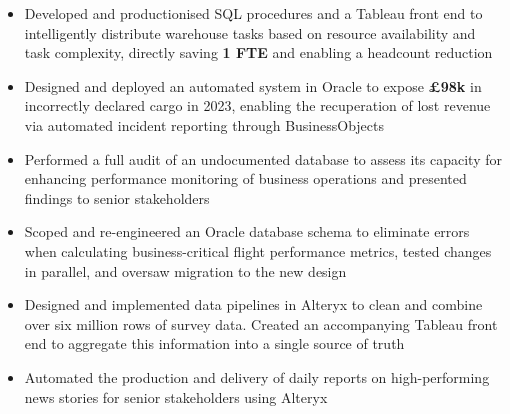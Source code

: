 \begin{paracol}{2}
\begin{itemize}

\medskip
{}

\end{itemize}

\divider

\begin{itemize}
\item Developed and productionised SQL procedures and a Tableau front end to intelligently distribute warehouse tasks based on resource availability and task complexity, directly saving \textbf{1 FTE} and enabling a headcount reduction
\item Designed and deployed an automated system in Oracle to expose \textbf{£98k} in incorrectly declared cargo in 2023, enabling the recuperation of lost revenue via automated incident reporting through BusinessObjects
\item Performed a full audit of an undocumented database to assess its capacity for enhancing performance monitoring of business operations and presented findings to senior stakeholders
\item Scoped and re-engineered an Oracle database schema to eliminate errors when calculating business-critical flight performance metrics, tested changes in parallel, and oversaw migration to the new design

\medskip
{}

\end{itemize}

\divider

\begin{itemize}
\item Designed and implemented data pipelines in Alteryx to clean and combine over six million rows of survey data. Created an accompanying Tableau front end to aggregate this information into a single source of truth
\item Automated the production and delivery of daily reports on high-performing news stories for senior stakeholders using Alteryx


\end{itemize}
\end{paracol}
